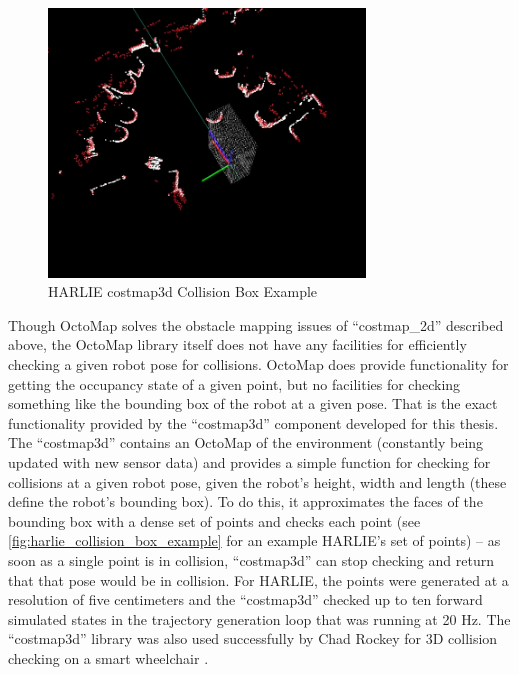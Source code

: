 \begin{figure}
\centering
\includegraphics[width=0.75\textwidth]{images/harlie_collision_box}
\caption{HARLIE costmap3d Collision Box Example \label{fig:harlie_collision_box_example}}
\end{figure}

Though OctoMap solves the obstacle mapping issues of ``costmap\_2d'' described above, the OctoMap library itself does not have any facilities for efficiently checking a given robot pose for collisions. OctoMap does provide functionality for getting the occupancy state of a given point, but no facilities for checking something like the bounding box of the robot at a given pose. That is the exact functionality provided by the ``costmap3d'' component developed for this thesis. The ``costmap3d'' contains an OctoMap of the environment (constantly being updated with new sensor data) and provides a simple function for checking for collisions at a given robot pose, given the robot's height, width and length (these define the robot's bounding box). To do this, it approximates the faces of the bounding box with a dense set of points and checks each point (see \autoref{fig:harlie_collision_box_example} for an example HARLIE's set of points) -- as soon as a single point is in collision, ``costmap3d'' can stop checking and return that that pose would be in collision. For HARLIE, the points were generated at a resolution of five centimeters and the ``costmap3d'' checked up to ten forward simulated states in the trajectory generation loop that was running at 20 Hz. The ``costmap3d'' library was also used successfully by Chad Rockey for 3D collision checking on a smart wheelchair \autocite{Rockey2012}.

